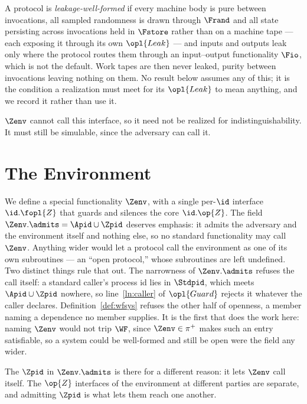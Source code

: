 \documentclass[10pt,oneside,openany]{book}
\theoremstyle{accentdef}
\theoremstyle{accentplain}
\begin{document}
A protocol is \emph{leakage-well-formed} if every machine body is pure between invocations, all
sampled randomness is drawn through $\Frand$ and all state persisting across invocations held in
$\Fstore$ rather than on a machine tape --- each exposing it through its own $\opl{Leak}$ --- and
inputs and outputs leak only where the protocol routes them through an input--output functionality
$\Fio$, which is not the default. Work tapes are then never leaked, purity between invocations
leaving nothing on them. No result below assumes any of this; it is the condition a realization
must meet for its $\opl{Leak}$ to mean anything, and we record it rather than use it.

$\Zenv$ cannot call this interface, so it need not be realized for indistinguishability. It must
still be simulable, since the adversary can call it.

\section{The Environment}\label{sec:env}

We define a special functionality $\Zenv$, with a single per-$\id$ interface $\id.\fopl{Z}$
that guards and silences the core $\id.\op{Z}$. The field $\Zenv.\admits = \Apid \cup \Zpid$
deserves emphasis: it admits the adversary and the environment itself and nothing else, so no
standard functionality may call $\Zenv$. Anything wider would let a protocol call the environment
as one of its own subroutines --- an ``open protocol,'' whose subroutines are left undefined. Two
distinct things rule that out. The narrowness of $\Zenv.\admits$ refuses the call itself: a
standard caller's process id lies in $\Stdpid$, which meets $\Apid \cup \Zpid$ nowhere, so
line~\ref{ln:caller} of $\opl{Guard}$ rejects it whatever the caller declares.
Definition~\ref{def:wfsys} refuses the other half of openness, a member naming a dependence no
member supplies. It is the first that does the work here: naming $\Zenv$ would not trip $\WF$,
since $\Zenv \in \pi^{+}$ makes such an entry satisfiable, so a system could be well-formed and
still be open were the field any wider.

The $\Zpid$ in $\Zenv.\admits$ is there for a different reason: it lets $\Zenv$ call itself. The
$\op{Z}$ interfaces of the environment at different parties are separate, and admitting $\Zpid$ is
what lets them reach one another.
\end{document}
